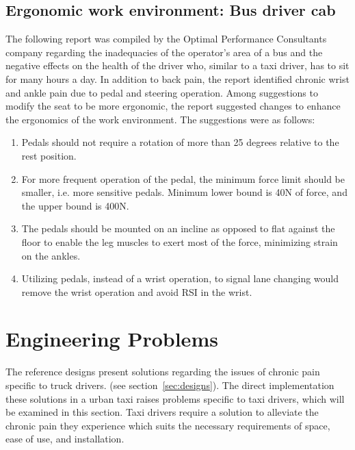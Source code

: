 \documentclass[11pt]{article}
\begin{document}
\subsection{Ergonomic work environment: Bus driver cab}
The following report was compiled by the Optimal Performance Consultants company regarding the 
inadequacies of the operator's area of a bus and the negative effects on the health of the driver who, similar to a taxi driver, has to sit 
for many hours a day\cite{Ismail2003}. In addition to back pain, the report 
identified chronic wrist and ankle pain due to pedal and steering operation. Among suggestions to modify the 
seat to be more ergonomic, the report suggested changes to enhance the ergonomics of the work environment. 
The suggestions were as follows:
\begin{enumerate}
\item Pedals should not require a rotation of more than 25 degrees relative to the rest position. 
\item For more frequent operation of the pedal, the minimum force limit should be smaller, 
i.e. more sensitive pedals. Minimum lower bound is 40N of force, and the upper bound is 400N.
\item The pedals should be mounted on an incline as opposed to flat against the floor to enable the leg 
muscles to exert most of the force, minimizing strain on the ankles. 
\item Utilizing pedals, instead of a wrist operation, to signal lane changing would remove the wrist operation
and avoid RSI in the wrist.
\end{enumerate}


\section{Engineering Problems}
\label{sec:engprob}
The reference designs present solutions regarding the issues of chronic pain specific to truck drivers. 
(see section~\ref{sec:designs}). The direct implementation these solutions in a urban 
taxi raises problems specific to taxi drivers, which will be examined in this section. Taxi drivers 
require a solution to alleviate the chronic pain they experience which suits the necessary requirements of 
space, ease of use, and installation.
\end{document}
